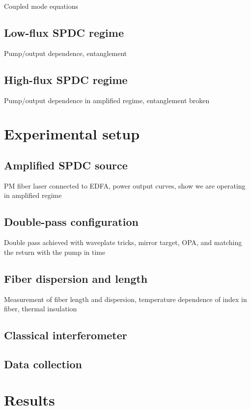 \documentclass{report}
\begin{document}
Coupled mode equations

\subsection{Low-flux SPDC regime}

Pump/output dependence, entanglement

\subsection{High-flux SPDC regime}

Pump/output dependence in amplified regime, entanglement broken

\section{Experimental setup}

\subsection{Amplified SPDC source}

PM fiber laser connected to EDFA, power output curves, show we are operating in amplified regime

\subsection{Double-pass configuration}

Double pass achieved with waveplate tricks, mirror target, OPA, and matching the return with the pump in time

\subsection{Fiber dispersion and length}

Measurement of fiber length and dispersion, temperature dependence of index in fiber, thermal insulation

\subsection{Classical interferometer}

\subsection{Data collection}

\section{Results}
\end{document}
